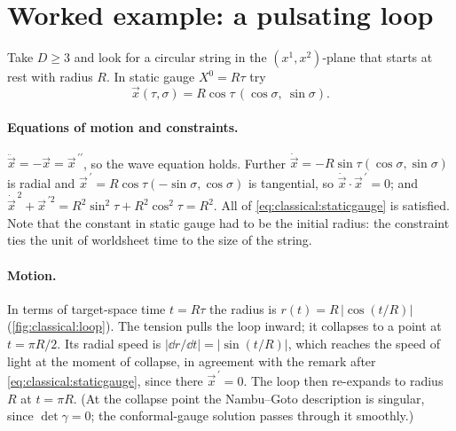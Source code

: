 \section{Worked example: a pulsating loop}\label{sec:classical:example}

Take $D\geq3$ and look for a circular string in the $(x^1,x^2)$-plane that starts at rest with
radius $R$. In static gauge $X^0=R\tau$ try
\begin{equation}\label{eq:classical:loop}
  \vec x(\tau,\sigma)=R\cos\tau\,(\cos\sigma,\ \sin\sigma).
\end{equation}

\paragraph{Equations of motion and constraints.} $\ddot{\vec x}=-\vec x=\vec x^{\,\prime\prime}$,
so the wave equation holds. Further $\dot{\vec x}=-R\sin\tau(\cos\sigma,\sin\sigma)$ is radial
and $\vec x^{\,\prime}=R\cos\tau(-\sin\sigma,\cos\sigma)$ is tangential, so
$\dot{\vec x}\cdot\vec x^{\,\prime}=0$; and
$\dot{\vec x}^{\,2}+\vec x^{\,\prime2}=R^2\sin^2\tau+R^2\cos^2\tau=R^2$. All of
\eqref{eq:classical:staticgauge} is satisfied. Note that the constant in static gauge had to
be the initial radius: the constraint ties the unit of worldsheet time to the size of the
string.

\paragraph{Motion.} In terms of target-space time $t=R\tau$ the radius is $r(t)=R\,|\cos(t/R)|$
(\cref{fig:classical:loop}). The tension pulls the loop inward; it collapses to a point at
$t=\pi R/2$. Its radial speed is $|\dd r/\dd t|=|\sin(t/R)|$, which reaches the speed of light
at the moment of collapse, in agreement with the remark after
\eqref{eq:classical:staticgauge}, since there $\vec x^{\,\prime}=0$. The loop then re-expands to
radius $R$ at $t=\pi R$. (At the collapse point the Nambu--Goto description is singular, since
$\det\gamma=0$; the conformal-gauge solution passes through it smoothly.)

